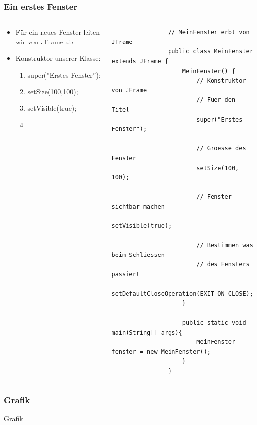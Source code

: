 \begin{frame}[fragile]
	\frametitle{Ein erstes Fenster}
	\begin{columns}
		\begin{column}{0.5\textwidth}
			\small
			\begin{itemize}
			  \item F\"ur ein neues Fenster leiten wir von JFrame ab
			  \item Konstruktor unserer Klasse:
			  	\begin{enumerate}
			  	  \item super(''Erstes Fenster'');
			  	  \item setSize(100,100);
			  	  \item setVisible(true);
			  	  \item \ldots
			  	\end{enumerate}
			\end{itemize}
		\end{column}
		\begin{column}{0.5\textwidth}
			\begin{lstlisting}
				// MeinFenster erbt von JFrame
				public class MeinFenster extends JFrame {
					MeinFenster() {
						// Konstruktor von JFrame
						// Fuer den Titel
						super("Erstes Fenster");
						
						// Groesse des Fenster
						setSize(100, 100);
						
						// Fenster sichtbar machen
						setVisible(true);
						
						// Bestimmen was beim Schliessen
						// des Fensters passiert
						setDefaultCloseOperation(EXIT_ON_CLOSE);
					}
					
					public static void main(String[] args){
						MeinFenster fenster = new MeinFenster();
					}
				}
			\end{lstlisting}
		\end{column}
	\end{columns}
\end{frame}  

\begin{frame}[fragile]
	\frametitle{Grafik}
	\huge Grafik
\end{frame} 

